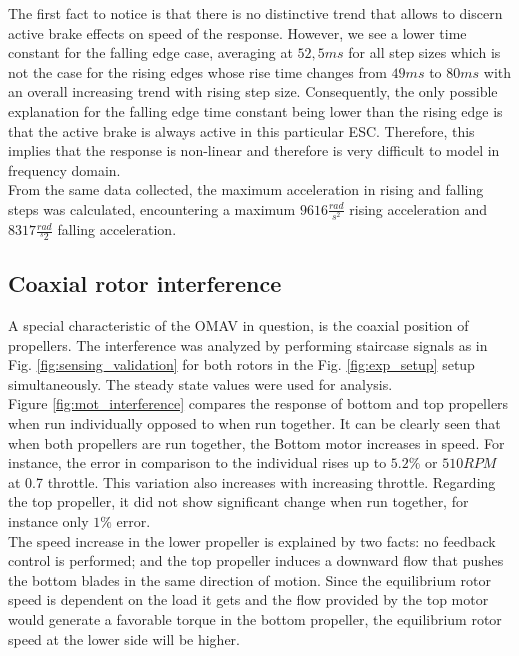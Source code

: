 The first fact to notice is that there is no distinctive trend that allows to discern active brake effects on speed of the response. However, we see a lower time constant for the falling edge case, averaging at $52,5ms$ for all step sizes which is not the case for the rising edges whose rise time changes from $49ms$ to $80ms$ with an overall increasing trend with rising step size. Consequently, the only possible explanation for the falling edge time constant being lower than the rising edge is that the active brake is always active in this particular ESC. Therefore, this implies that the response is non-linear and therefore is very difficult to model in frequency domain.\\

From the same data collected, the maximum acceleration in rising and falling steps was calculated, encountering a maximum $9616\tfrac{rad}{s^2}$ rising acceleration and $8317\tfrac{rad}{^s2}$ falling acceleration.


\subsection{Coaxial rotor interference}
A special characteristic of the OMAV in question, is the coaxial position of propellers. The interference was analyzed by performing staircase signals as in Fig. \ref{fig:sensing_validation} for both rotors in the Fig. \ref{fig:exp_setup} setup simultaneously. The steady state values were used for analysis.\\

Figure \ref{fig:mot_interference} compares the response of bottom and top propellers when run individually opposed to when run together. It can be clearly seen that when both propellers are run together, the Bottom motor increases in speed. For instance, the error in comparison to the individual rises up to $5.2\%$ or $510RPM$ at 0.7 throttle. This variation also increases with increasing throttle. Regarding the top propeller, it did not show significant change when run together, for instance only $1\%$ error. \\

The speed increase in the lower propeller is explained by two facts: no feedback control is performed; and the top propeller induces a downward flow that pushes the bottom blades in the same direction of motion. Since the equilibrium rotor speed is dependent on the load it gets and the flow provided by the top motor would generate a favorable torque in the bottom propeller, the equilibrium rotor speed at the lower side will be higher. \\

